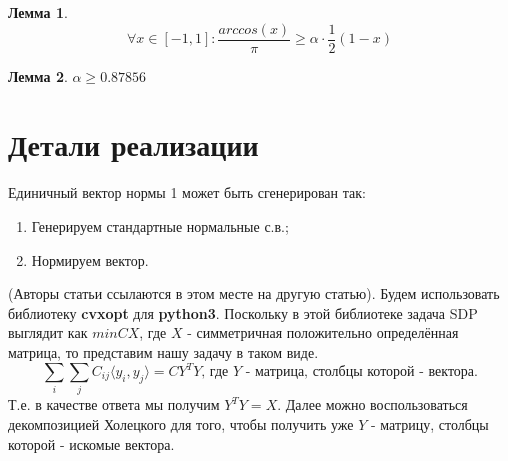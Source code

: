 \documentclass[12pt]{article}
\newtheorem{lemma}{Лемма}
\begin{document}
\begin{lemma}
$$
\forall x \in [-1, 1]: \frac{arccos(x)}{\pi} \geq \alpha \cdot \frac{1}{2} (1 - x)
$$
\end{lemma}
\begin{lemma}
$\alpha \geq 0.87856$
\end{lemma}

\section{Детали реализации}
Единичный вектор нормы 1 может быть сгенерирован так:
\begin{enumerate}
    \item Генерируем стандартные нормальные с.в.;
    \item Нормируем вектор.
\end{enumerate}
(Авторы статьи ссылаются в этом месте на другую статью).
Будем использовать библиотеку \textbf{cvxopt} для \textbf{python3}.
Поскольку в этой библиотеке задача SDP выглядит как $min CX$, где $X$ - симметричная положительно определённая матрица,
то представим нашу задачу в таком виде.
$$
\sum_i \sum_j C_{ij} \langle y_i, y_j \rangle = C Y^T Y \text{, где }Y\text{ - матрица, столбцы которой - вектора.}
$$
Т.е. в качестве ответа мы получим $Y^T Y = X$.
Далее можно воспользоваться декомпозицией Холецкого для того, чтобы
получить уже  $Y$ - матрицу, столбцы которой - искомые вектора.
\end{document}
